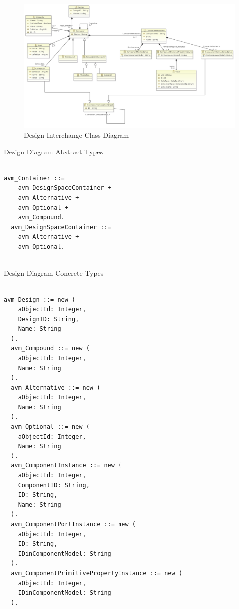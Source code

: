\begin{figure}[H]
\centering
\includegraphics[width=\textwidth]{./AVM_Formal_Semantics/5}
\caption{Design Interchange Class Diagram}
\end{figure}

Design Diagram Abstract Types
\begin{lstlisting}

avm_Container ::=
    avm_DesignSpaceContainer +
    avm_Alternative +
    avm_Optional +
    avm_Compound.
  avm_DesignSpaceContainer ::=
    avm_Alternative +
    avm_Optional.


\end{lstlisting}

Design Diagram Concrete Types
\begin{lstlisting}

avm_Design ::= new (
    aObjectId: Integer,
    DesignID: String,
    Name: String
  ).
  avm_Compound ::= new (
    aObjectId: Integer,
    Name: String
  ).
  avm_Alternative ::= new (
    aObjectId: Integer,
    Name: String
  ).
  avm_Optional ::= new (
    aObjectId: Integer,
    Name: String
  ).
  avm_ComponentInstance ::= new (
    aObjectId: Integer,
    ComponentID: String,
    ID: String,
    Name: String
  ).
  avm_ComponentPortInstance ::= new (
    aObjectId: Integer,
    ID: String,
    IDinComponentModel: String
  ).
  avm_ComponentPrimitivePropertyInstance ::= new (
    aObjectId: Integer,
    IDinComponentModel: String
  ).


\end{lstlisting}

